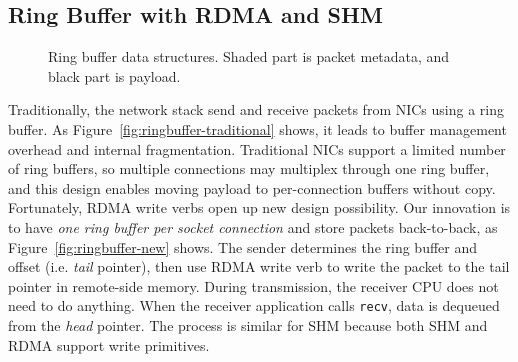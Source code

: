 \subsection{Ring Buffer with RDMA and SHM}
\label{subsec:lockless-queue}

\begin{figure}[t]
	\centering
	\hspace{0.02\textwidth}
	\vspace{-10pt}
	\caption{Ring buffer data structures. Shaded part is packet metadata, and black part is payload.}
\end{figure}

Traditionally, the network stack send and receive packets from NICs using a ring buffer.
As Figure~\ref{fig:ringbuffer-traditional} shows, it leads to buffer management overhead and internal fragmentation.
Traditional NICs support a limited number of ring buffers, so multiple connections may multiplex through one ring buffer, and this design enables moving payload to per-connection buffers without copy.
Fortunately, RDMA write verbs open up new design possibility.
Our innovation is to have \emph{one ring buffer per socket connection} and store packets back-to-back, as Figure~\ref{fig:ringbuffer-new} shows.
The sender determines the ring buffer and offset (i.e. \emph{tail} pointer), then use RDMA write verb to write the packet to the tail pointer in remote-side memory.
During transmission, the receiver CPU does not need to do anything.
When the receiver application calls \texttt{recv}, data is dequeued from the \emph{head} pointer.
The process is similar for SHM because both SHM and RDMA support write primitives.

